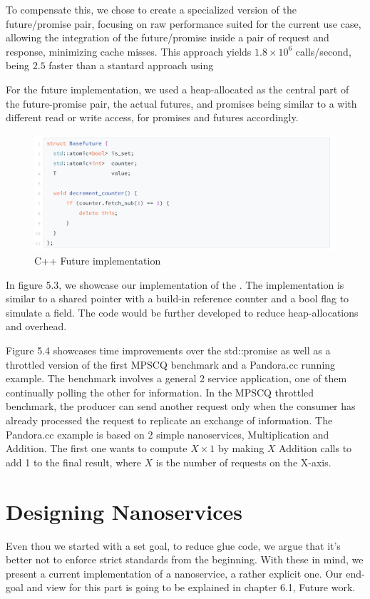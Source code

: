 To compensate this, we chose to create a specialized version of the future/promise pair, focusing on raw performance suited for the current use case, allowing the integration of the future/promise inside a pair of request and response, minimizing cache misses. This approach yields $1.8 \times 10^6$ calls/second, being $2.5$ faster than a stantard approach using  


For the future implementation, we used a heap-allocated  as the central part of the future-promise pair, the actual futures, and promises being similar to a  with different read or write access, for promises and futures accordingly.
\begin{figure}[H]
\includegraphics[width=1\linewidth]{content/fig/basefuture.png}
\caption{C++ Future implementation}
\end{figure}

In figure 5.3, we showcase our implementation of the . The implementation is similar to a shared pointer with a build-in reference counter and a bool flag to simulate a  field. The code would be further developed to reduce heap-allocations and overhead.




Figure 5.4 showcases time improvements over the std::promise as well as a throttled version of the first MPSCQ benchmark and a Pandora.cc running example. The benchmark involves a general 2 service application, one of them continually polling the other for information. In the MPSCQ throttled benchmark, the producer can send another request only when the consumer has already processed the request to replicate an exchange of information. The Pandora.cc example is based on 2 simple nanoservices, Multiplication and Addition. The first one wants to compute $X \times 1$ by making $X$ Addition calls to add 1 to the final result, where $X$ is the number of requests on the X-axis.


\section{Designing Nanoservices}
Even thou we started with a set goal, to reduce glue code, we argue that it's better not to enforce strict standards from the beginning. With these in mind, we present a current implementation of a nanoservice, a rather explicit one. Our end-goal and view for this part is going to be explained in chapter 6.1, Future work.

